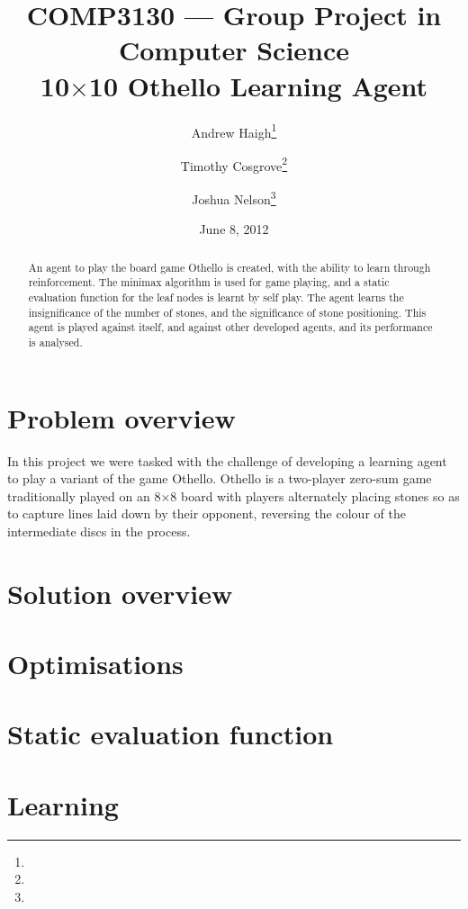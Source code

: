 \documentclass[11pt]{article}
\title{%
  COMP3130 --- Group Project in Computer Science \\
  10$\times$10 Othello Learning Agent}
\date{June 8, 2012}
\author{%
  Andrew Haigh\thanks{\uid{u4667010}} \and
  Timothy Cosgrove\thanks{\uid{u4843619}} \and
  Joshua Nelson\thanks{\uid{u4850020}}}
\begin{document}
\maketitle
\begin{abstract}
  \label{abstract}
  An agent to play the board game Othello is created, with the ability
  to learn through reinforcement. The minimax algorithm is used for game
  playing, and a static evaluation function for the leaf nodes is learnt by
  self play.  The agent learns the insignificance of the number of stones, and
  the significance of stone positioning. This agent is played against itself,
  and against other developed agents, and its performance is analysed.
\end{abstract}
\clearpage

\section{Problem overview}
\label{sec:problem_overview}
In this project we were tasked with the challenge of developing a learning
agent to play a variant of the game Othello. Othello is a two-player zero-sum
game traditionally played on an 8$\times$8 board with players alternately
placing stones so as to capture lines laid down by their opponent, reversing
the colour of the intermediate discs in the process.


\section{Solution overview}
\label{sec:solution_overview}

\section{Optimisations}
\label{sec:optimisations}

\section{Static evaluation function}
\label{sec:eval_func}

\section{Learning}
\label{sec:learning}
\end{document}
